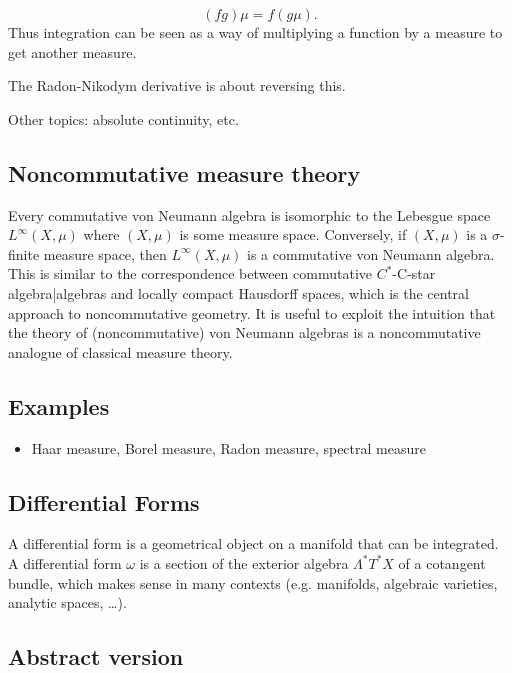 \documentclass[preprint, 5p, 10pt]{elsarticle}
\theoremstyle{plain}
\begin{document}
\begin{displaymath}
(f g) \mu = f (g \mu) .
\end{displaymath}
Thus integration can be seen as a way of multiplying a function by a measure to get another measure.

The Radon-Nikodym derivative is about reversing this.

Other topics: absolute continuity, etc.

\hypertarget{noncommutative_measure_theory_12}{}\subsection*{{Noncommutative measure theory}}\label{noncommutative_measure_theory_12}

Every commutative von Neumann algebra is isomorphic to the Lebesgue space $L^\infty(X,\mu)$ where $(X,\mu)$ is some measure space. Conversely, if $(X,\mu)$ is a $\sigma$-finite measure space, then $L^\infty(X,\mu)$ is a commutative von Neumann algebra. This is similar to the correspondence between commutative $C^*$-C-star algebra|algebras and locally compact Hausdorff spaces, which is the central approach to noncommutative geometry. It is useful to exploit the intuition that the theory of (noncommutative) von Neumann algebras is a noncommutative analogue of classical measure theory.

\hypertarget{examples_13}{}\subsection*{{Examples}}\label{examples_13}

\begin{itemize}%
\item Haar measure, Borel measure, Radon measure, spectral measure

\end{itemize}
\subsection{Differential Forms}
A differential form is a geometrical object on a manifold that can be integrated. A differential form $\omega$ is a section of the exterior algebra $\Lambda^* T^* X$ of a cotangent bundle, which makes sense in many contexts (e.g. manifolds, algebraic varieties, analytic spaces, \ldots{}).

\hypertarget{abstract_version_3}{}\subsection*{{Abstract version}}\label{abstract_version_3}
\end{document}
